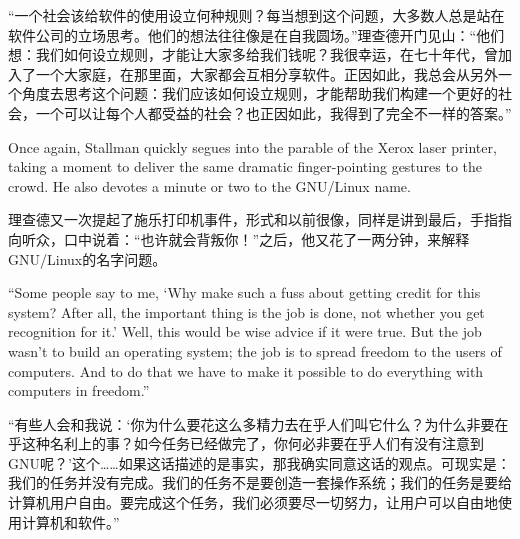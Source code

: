 \ifdefined\chs
“一个社会该给软件的使用设立何种规则？每当想到这个问题，大多数人总是站在软件公司的立场思考。他们的想法往往像是在自我圆场。”理查德开门见山：“他们想：我们如何设立规则，才能让大家多给我们钱呢？我很幸运，在七十年代，曾加入了一个大家庭，在那里面，大家都会互相分享软件。正因如此，我总会从另外一个角度去思考这个问题：我们应该如何设立规则，才能帮助我们构建一个更好的社会，一个可以让每个人都受益的社会？也正因如此，我得到了完全不一样的答案。”
\fi

\ifdefined\eng
Once again, Stallman quickly segues into the parable of the Xerox laser printer, taking a moment to deliver the same dramatic finger-pointing gestures to the crowd. He also devotes a minute or two to the GNU/Linux name.
\fi

\ifdefined\chs
理查德又一次提起了施乐打印机事件，形式和以前很像，同样是讲到最后，手指指向听众，口中说着：“也许就会背叛你！”之后，他又花了一两分钟，来解释GNU/Linux的名字问题。
\fi

\ifdefined\eng
``Some people say to me, `Why make such a fuss about getting credit for this system? After all, the important thing is the job is done, not whether you get recognition for it.' Well, this would be wise advice if it were true. But the job wasn't to build an operating system; the job is to spread freedom to the users of computers. And to do that we have to make it possible to do everything with computers in freedom.''
\fi

\ifdefined\chs
“有些人会和我说：‘你为什么要花这么多精力去在乎人们叫它什么？为什么非要在乎这种名利上的事？如今任务已经做完了，你何必非要在乎人们有没有注意到GNU呢？’这个……如果这话描述的是事实，那我确实同意这话的观点。可现实是：我们的任务并没有完成。我们的任务不是要创造一套操作系统；我们的任务是要给计算机用户自由。要完成这个任务，我们必须要尽一切努力，让用户可以自由地使用计算机和软件。”
\fi

